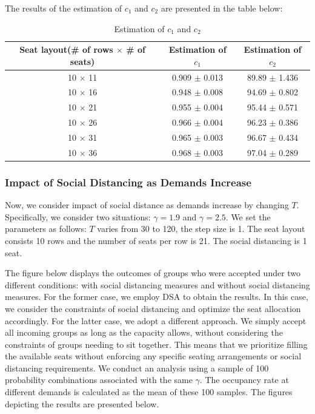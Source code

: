 The results of the estimation of $c_1$ and $c_2$ are presented in the table below:

\begin{table}[ht]
  \centering
  \caption{Estimation of $c_1$ and $c_2$}
  \begin{tabular}{|c|c|c|}
  \hline
   Seat layout(\# of rows $\times$ \# of seats) & Estimation of $c_1$ & Estimation of $c_2$  \\
  \hline
   10 $\times$ 11 & 0.909 $\pm$ 0.013  & 89.89 $\pm$ 1.436 \\
   10 $\times$ 16 & 0.948 $\pm$ 0.008  & 94.69 $\pm$ 0.802 \\
   10 $\times$ 21 & 0.955 $\pm$ 0.004 & 95.44 $\pm$ 0.571 \\
   10 $\times$ 26 & 0.966 $\pm$ 0.004 & 96.23 $\pm$ 0.386 \\
   10 $\times$ 31 & 0.965 $\pm$ 0.003 & 96.67 $\pm$ 0.434 \\
   10 $\times$ 36 & 0.968 $\pm$ 0.003 & 97.04 $\pm$ 0.289 \\
   \hline
  \end{tabular}
\end{table}


\subsubsection{Impact of Social Distancing as Demands Increase}
Now, we consider impact of social distance as demands increase by changing $T$. Specifically, we consider two situations: $\gamma = 1.9$ and $\gamma = 2.5$. We set the parameters as follows: $T$ varies from 30 to 120, the step size is 1.  The seat layout consists 10 rows and the number of seats per row is 21. The social distancing is 1 seat.

The figure below displays the outcomes of groups who were accepted under two different conditions: with social distancing measures and without social distancing measures. For the former case, we employ DSA to obtain the results. In this case, we consider the constraints of social distancing and optimize the seat allocation accordingly. For the latter case, we adopt a different approach. We simply accept all incoming groups as long as the capacity allows, without considering the constraints of groups needing to sit together. This means that we prioritize filling the available seats without enforcing any specific seating arrangements or social distancing requirements. We conduct an analysis using a sample of 100 probability combinations associated with the same $\gamma$. The occupancy rate at different demands is calculated as the mean of these 100 samples. The figures depicting the results are presented below.


